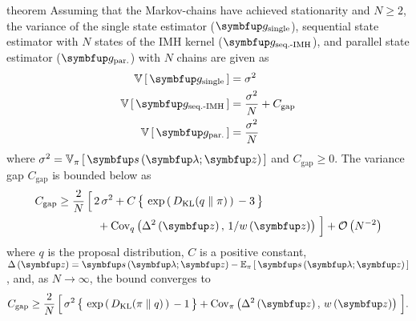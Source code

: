 
\begin{theoremEnd}{theorem}\label{thm:var}
  Assuming that the Markov-chains have achieved stationarity and \(N \geq 2\), the variance of the single state estimator (\(\vg_{\text{single}}\)), sequential state estimator with \(N\) states of the IMH kernel (\(\vg_{\text{seq.-IMH}}\)), and parallel state estimator (\(\vg_{\text{par.}}\)) with \(N\) chains are given as 
  \begin{align*}
    \V{\vg_{\text{single}}}   &= \sigma^2  \\
    \V{\vg_{\text{seq.-IMH}}} &= \frac{\sigma^2}{N} + C_{\text{gap}} \\
    \V{\vg_{\text{par.}}}    &= \frac{\sigma^2}{N}
  \end{align*}
  where \(\sigma^2 = \Vsub{\pi}{\vs\left(\vlambda; \vz\right)} \) and \(C_{\text{gap}} \geq 0\).
  The variance gap \(C_{\text{gap}}\) is bounded below as
  {
  \begin{align*}
    C_{\text{gap}}
    \geq
    \frac{2}{N} \, \Big[\,
    &2\,\sigma^2
    +
    C \, \big\{\,
    \exp\,(\,
    \DKL{q}{\pi}
    \,)\,
    -
    3
    \,\big\}
    \\
    &\; +
    \text{Cov}_{q}\left(\Delta^2\left(\vz\right),\, 1/ w\left(\vz\right) \right)
    \,\Big]
    +
    \mathcal{O}\left(N^{-2}\right)
  \end{align*}
  }%
  where \(q\) is the proposal distribution, \(C\) is a positive constant, \(\Delta\left(\vz\right) = \vs\left(\vlambda;\vz\right) - \Esub{\pi}{\vs\left(\vlambda;\vz\right)}\),
  and, as \(N \rightarrow \infty\), the bound converges to
  {\small
  \begin{align*}
    C_{\text{gap}}
    \geq
    \frac{2}{N} \, \Big[\,
    \sigma^2 \, \big\{\,
    \exp\,(\,
    \DKL{\pi}{q}
    \,)\,
    -
    1
    \,\big\}
     +
    \text{Cov}_{\pi}\left(\Delta^2\left(\vz\right),\, w\left(\vz\right) \right)
    \,\Big].
  \end{align*}
  }
\end{theoremEnd}
%

